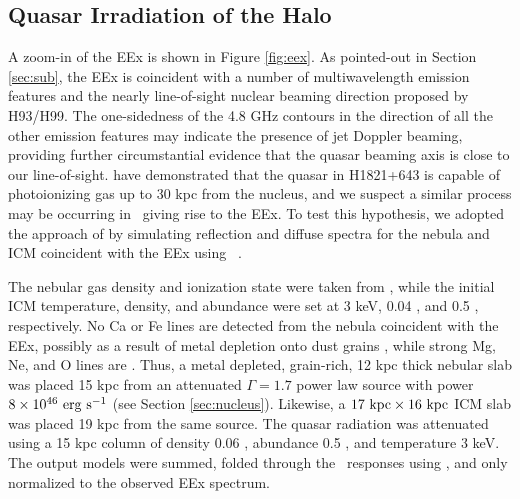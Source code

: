 \documentclass[useAMS,usenatbib]{mn2e}
\begin{document}
\subsection{Quasar Irradiation of the Halo}

A zoom-in of the EEx is shown in Figure \ref{fig:eex}. As pointed-out
in Section \ref{sec:sub}, the EEx is coincident with a number of
multiwavelength emission features and the nearly line-of-sight nuclear
beaming direction proposed by H93/H99. The one-sidedness of the 4.8
GHz contours in the direction of all the other emission features may
indicate the presence of jet Doppler beaming, providing further
circumstantial evidence that the quasar beaming axis is close to our
line-of-sight. \citet{2010MNRAS.402.1561R} have demonstrated that the
quasar in H1821+643 is capable of photoionizing gas up to 30 kpc from
the nucleus, and we suspect a similar process may be occurring in
\irs\ giving rise to the EEx. To test this hypothesis, we adopted the
approach of \citet{2010MNRAS.402.1561R} by simulating reflection and
diffuse spectra for the nebula and ICM coincident with the EEx using
\cloudy\ \citep{cloudy}.

The nebular gas density and ionization state were taken from
\citet{2000AJ....120..562T}, while the initial ICM temperature,
density, and abundance were set at 3 keV, 0.04 \pcc, and 0.5 \Zsol,
respectively. No Ca or Fe lines are detected from the nebula
coincident with the EEx, possibly as a result of metal depletion onto
dust grains \citep[\eg][]{1993ApJ...414L..17D}, while strong Mg, Ne,
and O lines are \citep{2000AJ....120..562T}. Thus, a metal depleted,
grain-rich, 12 kpc thick nebular slab was placed 15 kpc from an
attenuated $\Gamma = 1.7$ power law source with power $8 \times
10^{46} ~\rm{\mbox{\ensuremath{\rm{erg}}}~\ensuremath{\rm{\mbox{\ensuremath{\rm{s}}}^{-1}}}}$ (see Section \ref{sec:nucleus}). Likewise, a $17 ~\mbox{\ensuremath{\rm{kpc}}}
\times 16 ~\mbox{\ensuremath{\rm{kpc}}}$ ICM slab was placed 19 kpc from the same source. The
quasar radiation was attenuated using a 15 kpc column of density 0.06
\pcc, abundance 0.5 \Zsol, and temperature 3 keV. The output models
were summed, folded through the \cxo\ responses using \xspec, and only
normalized to the observed EEx spectrum.
\end{document}
